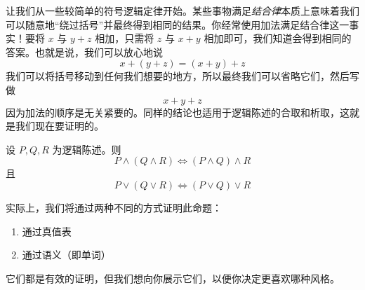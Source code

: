让我们从一些较简单的符号逻辑定律开始。某些事物满足\emph{结合律}本质上意味着我们可以随意地``绕过括号''并最终得到相同的结果。你经常使用加法满足结合律这一事实！要将 $x$ 与 $y + z$ 相加，只需将 $z$ 与 $x+y$ 相加即可，我们知道会得到相同的答案。也就是说，我们可以放心地说
\[x + (y + z) = (x + y) + z\]
我们可以将括号移动到任何我们想要的地方，所以最终我们可以省略它们，然后写做
\[x+y+z\]
因为加法的顺序是无关紧要的。同样的结论也适用于逻辑陈述的合取和析取，这就是我们现在要证明的。

\begin{theorem}
    设 $P, Q, R$ 为逻辑陈述。则
    \[P \land (Q \land R) \iff (P \land Q) \land R\]
    且
    \[P \lor (Q \lor R) \iff (P \lor Q) \lor R\]
\end{theorem}

实际上，我们将通过两种不同的方式证明此命题：
\begin{enumerate}[label=(\arabic*)]
    \item 通过真值表
    \item 通过语义（即单词）
\end{enumerate}
它们都是有效的证明，但我们想向你展示它们，以便你决定更喜欢哪种风格。

